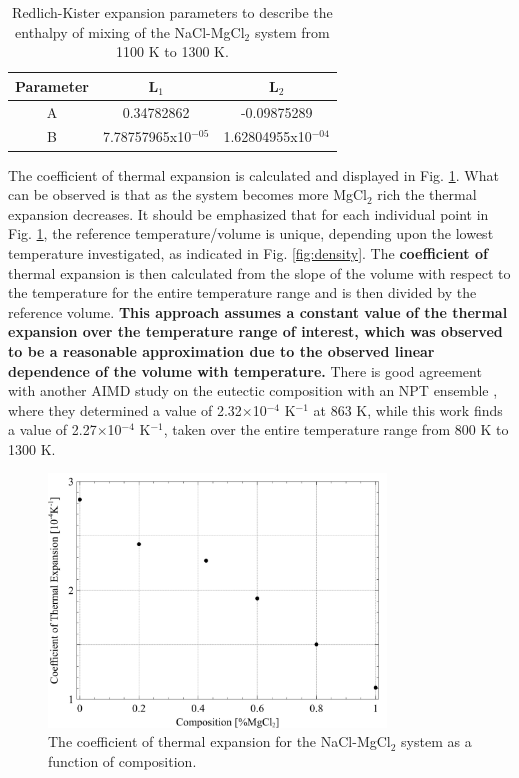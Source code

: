 \documentclass[review]{elsarticle}
\providecommand{\DIFaddtex}[1]{{\bf #1}} %
\providecommand{\DIFdeltex}[1]{} %
\providecommand{\DIFaddbegin}{\protect\color{blue}} %
\providecommand{\DIFaddend}{\protect\color{black}} %
\providecommand{\DIFaddFL}[1]{\DIFadd{#1}} %
\providecommand{\DIFdelFL}[1]{\DIFdel{#1}} %
\providecommand{\DIFaddbeginFL}{} %
\providecommand{\DIFaddendFL}{} %
\providecommand{\DIFdelbeginFL}{} %
\providecommand{\DIFdelendFL}{} %
\providecommand{\DIFadd}[1]{\texorpdfstring{\DIFaddtex{#1}}{#1}} %
\providecommand{\DIFdel}[1]{\texorpdfstring{\DIFdeltex{#1}}{}} %
\newcommand{\DIFscaledelfig}{0.5}
\newlength{\DIFdelgraphicswidth} %
\newlength{\DIFdelgraphicsheight} %
\newcommand{\DIFaddincludegraphics}[2][]{{\color{blue}\fbox{\DIFOincludegraphics[#1]{#2}}}} %
\newcommand{\DIFdelincludegraphics}[2][]{%
\sbox{\DIFdelgraphicsbox}{\DIFOincludegraphics[#1]{#2}}%
\settoboxwidth{\DIFdelgraphicswidth}{\DIFdelgraphicsbox} %
\settoboxtotalheight{\DIFdelgraphicsheight}{\DIFdelgraphicsbox} %
\scalebox{\DIFscaledelfig}{%
\parbox[b]{\DIFdelgraphicswidth}{\usebox{\DIFdelgraphicsbox}\\[-\baselineskip] \rule{\DIFdelgraphicswidth}{0em}}\llap{\resizebox{\DIFdelgraphicswidth}{\DIFdelgraphicsheight}{%
\setlength{\unitlength}{\DIFdelgraphicswidth}%
\begin{picture}(1,1)%
\thicklines\linethickness{2pt} %
{\color[rgb]{1,0,0}\put(0,0){\framebox(1,1){}}}%
{\color[rgb]{1,0,0}\put(0,0){\line( 1,1){1}}}%
{\color[rgb]{1,0,0}\put(0,1){\line(1,-1){1}}}%
\end{picture}%
}\hspace*{3pt}}} %
} %
\DeclareRobustCommand{\DIFaddbegin}{\DIFOaddbegin \let\includegraphics\DIFaddincludegraphics} %
\DeclareRobustCommand{\DIFaddend}{\DIFOaddend \let\includegraphics\DIFOincludegraphics} %
\DeclareRobustCommand{\DIFaddbeginFL}{\DIFOaddbeginFL \let\includegraphics\DIFaddincludegraphics} %
\DeclareRobustCommand{\DIFaddendFL}{\DIFOaddendFL \let\includegraphics\DIFOincludegraphics} %
\DeclareRobustCommand{\DIFdelbeginFL}{\DIFOdelbeginFL \let\includegraphics\DIFdelincludegraphics} %
\DeclareRobustCommand{\DIFdelendFL}{\DIFOaddendFL \let\includegraphics\DIFOincludegraphics} %
\begin{document}
\begin{table}[]
\centering
\caption{Redlich-Kister expansion parameters to describe the enthalpy of mixing of the NaCl-MgCl$_2$ system from 1100 K to 1300 K.}
\begin{tabular}{|c|c|c|}
\hline
Parameter & \DIFdelbeginFL \DIFdelFL{1 }\DIFdelendFL \DIFaddbeginFL \DIFaddFL{L$_1$ }\DIFaddendFL & \DIFdelbeginFL \DIFdelFL{2 }\DIFdelendFL \DIFaddbeginFL \DIFaddFL{L$_2$ }\DIFaddendFL \\
\hline

A	& 0.34782862    & -0.09875289\\
B	  & 7.78757965x10$^{-05}$   & 1.62804955x10$^{-04}$\\
\hline
\end{tabular}
\label{table:RK_en}
\end{table}

The coefficient of thermal expansion is calculated and displayed in Fig. \ref{fig:CTE}. What can be observed is that as the system becomes more MgCl$_2$ rich the thermal expansion decreases. It should be emphasized that for each individual point in Fig. \ref{fig:CTE}, the reference temperature/volume is unique, depending upon the lowest temperature investigated, as indicated in Fig. \ref{fig:density}. The \DIFaddbegin \DIFadd{coefficient of }\DIFaddend thermal expansion is then calculated from the slope of the volume with respect to the temperature for the entire temperature range and is then divided by the reference volume. \DIFaddbegin \DIFadd{This approach assumes a constant value of the thermal expansion over the temperature range of interest, which was observed to be a reasonable approximation due to the observed linear dependence of the volume with temperature. }\DIFaddend There is good agreement with another AIMD study on the eutectic composition with an NPT ensemble \cite{XU2020568}, where they determined a value of 2.32$\times$10$^{-4}$ K$^{-1}$ at 863 K, while this work finds a value of 2.27$\times$10$^{-4}$ K$^{-1}$, taken over the entire temperature range from 800 K to 1300 K. 

\begin{figure}[h]
 \centering
 \includegraphics[width=0.8\textwidth]{images/CTE.jpg} 
 \caption{The coefficient of thermal expansion for the NaCl-MgCl$_{2}$ system as a function of composition.}
 \label{fig:CTE}
\end{figure} 
\FloatBarrier
\end{document}
